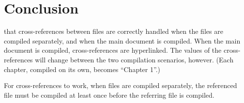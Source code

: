 \documentclass[\main/thesis.tex]{subfiles}
\begin{document}
\chapter{Conclusion}

that cross-references between files are correctly handled when the files
are compiled separately, and when the main document is compiled.
When the main document is compiled, cross-references are hyperlinked.
The values of the cross-references will change between the two compilation
scenarios, however. (Each chapter, compiled on its own, becomes ``Chapter 1''.)

\begin{note}[Caution:]
For cross-references to work, when files are compiled separately,
the referenced file must be compiled at least once before the
referring file is compiled.
\end{note}
\end{document}
